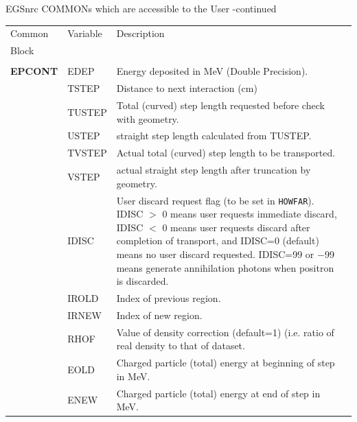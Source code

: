 \begin{table}[htb]
      
       
       
       

    \begin{center}
    EGSnrc COMMONs which are accessible to the User -continued\vspace*{3mm}
    \begin{tabular}{ l  l   p{105mm}l  |}
    \hline
    Common & Variable & Description \\
    Block &&\\
    \hline
&&\\
{\bfseries EPCONT}  & EDEP & Energy deposited in MeV (Double
                            Precision).\\
        & TSTEP  & Distance to next interaction (cm)\\
        & TUSTEP  & Total (curved) step length requested before check with
		geometry.\\
	& USTEP	& straight step length calculated from TUSTEP.\\
        & TVSTEP & Actual total (curved) step length to be transported.\\
	& VSTEP	& actual straight step length after truncation by geometry.\\
        & IDISC  & User discard request flag (to be set in {\tt HOWFAR}).
                   IDISC $>$ 0 means user requests immediate discard,
                   IDISC $<$ 0 means user requests discard after completion
                   of transport, and IDISC=0 (default) means no user
                   discard requested. IDISC=99 or $-$99 means generate
		   annihilation photons when positron is discarded.\\
         &IROLD  &Index of previous region.\\
         & IRNEW  & Index of new region.\\
         & RHOF   & Value of density correction (default=1) (i.e. ratio
                    of real density to that of dataset.\\
         & EOLD   &  Charged particle (total) energy
                            at beginning of step in MeV.\\
           & ENEW   & Charged particle (total) energy
                            at end of step in MeV.\\


\end{tabular}
\end{center}
\end{table}
